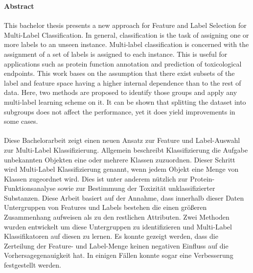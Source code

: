 

\clearemptydoublepage
{}
{}	





\vspace*{2cm}
\begin{center}
{\Large \bf Abstract}
\end{center}
\vspace{1cm}

\paragraph*{} This bachelor thesis presents a new approach for Feature and Label Selection for Multi-Label Classification. In general, classification is the task of assigning one or more labels to an unseen instance. Multi-label classification is concerned with the assignment of a set of labels is assigned to each instance. This is useful for applications such as protein function annotation and prediction of toxicological endpoints. This work bases on the assumption that there exist subsets of the label and feature space having a higher internal dependence than to the rest of data. Here, two methods are proposed to identify those groups and apply any multi-label learning scheme on it. It can be shown that splitting the dataset into subgroups does not affect the performance, yet it does yield improvements in some cases.

\paragraph*{} Diese Bachelorarbeit zeigt einen neuen Ansatz zur Feature und Label-Auswahl zur Multi-Label Klassifizierung. Allgemein beschreibt Klassifizierung die Aufgabe unbekannten Objekten eine oder mehrere Klassen zuzuordnen. Dieser Schritt wird Multi-Label Klassifizierung genannt, wenn jedem Objekt eine Menge von Klassen zugeordnet wird. Dies ist unter anderem n\"utzlich zur Protein-Funktionsanalyse sowie zur Bestimmung der Toxizit\"at unklassifizierter Substanzen. Diese Arbeit basiert auf der Annahme, dass innerhalb dieser Daten Untergruppen von Features und Labels bestehen die einen gr\"o\ss{}eren Zusammenhang aufweisen als zu den restlichen Attributen. Zwei Methoden wurden entwickelt um diese Untergruppen zu identifizieren und Multi-Label Klassifikatoren auf diesen zu lernen. Es konnte gezeigt werden, dass die Zerteilung der Feature- und Label-Menge keinen negativen Einfluss auf die Vorhersagegenauigkeit hat. In einigen F\"allen konnte sogar eine Verbesserung festgestellt werden. 